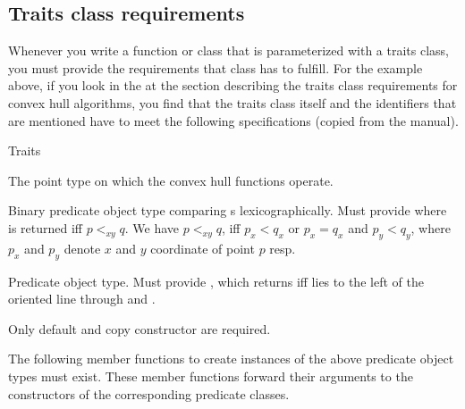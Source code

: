 \subsection{Traits class requirements}
\label{subsec:traits_class_requirements}

Whenever you write a function or class that is  parameterized with a traits
class, you must provide the requirements that class has to fulfill. For the
example above, if you look in the  at the section describing
the traits class requirements for convex hull algorithms, you find that the 
traits class itself and the identifiers that are mentioned have to meet the 
following specifications (copied from the manual).

\ccHtmlNoClassLinks%
\ccAutoIndexingOff
\begin{ccClass}{Traits}

\ccTypes

%
       {The point type on which the convex hull functions operate.}

%
       {Binary predicate object type comparing s
lexicographically.
        Must provide  where
        is returned iff $p <_{xy} q$.
        We have $p<_{xy}q$, iff $p_x < q_x$ or $p_x = q_x$ and $p_y < q_y$,
        where $p_x$ and $p_y$ denote $x$ and $y$ coordinate of point $p$ resp.
       }

%
       {Predicate object type. Must provide 
        , which
        returns  iff  lies to the left of the 
        oriented line through  and .}

\ccCreation
{}

Only default and copy constructor are required.



\ccOperations

The following member functions to create instances of the above predicate 
object types must exist. These member functions forward their 
arguments to the constructors of the corresponding predicate classes.  


\end{ccClass}
\ccAutoIndexingOn

